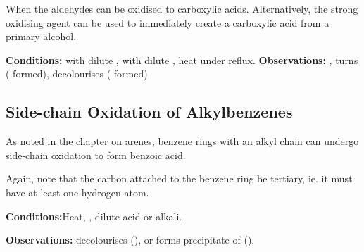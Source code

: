 			When the aldehydes can be oxidised to carboxylic acids. Alternatively, the strong oxidising agent  can be used to
			immediately create a carboxylic acid from a primary alcohol.

			\vspace{1.5em}
			\vbox{\textbf{Conditions:}	\tabto{35mm} with dilute ,   with dilute ,
										\tabto{35mm}heat under reflux.}
			\vspace{0.75em}
			\vbox{\textbf{Observations:}\tabto{35mm} , turns 
													( formed), 
										\tabto{35mm}  decolourises ( formed)}





		\pagebreak
		\subsection{Side-chain Oxidation of Alkylbenzenes}

			As noted in the chapter on arenes, benzene rings with an alkyl chain can undergo side-chain oxidation to form benzoic acid.

			Again, note that the carbon attached to the benzene ring  be tertiary, ie. it must have at least one hydrogen atom.


			\vspace{1.5em}

			\vbox{\textbf{Conditions:}\tabto{35mm}Heat, , dilute acid or alkali.}

			\vspace{0.75em}
			\vbox{\textbf{Observations:}\tabto{35mm}  decolourises (), or
										\tabto{35mm}forms  precipitate of  ().}


